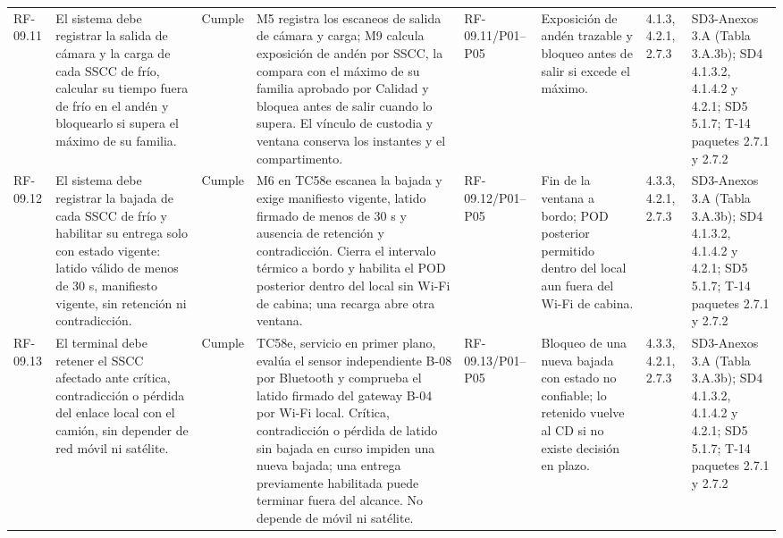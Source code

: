 \documentclass[oficio,firma,final]{lafrox}
\begin{document}
\begin{landscape}
{\begin{longtable}{@{}F{0.054} F{0.173} F{0.061} F{0.191} F{0.106} F{0.180} F{0.067} F{0.168}@{}}
  RF-09.11 & El sistema debe registrar la salida de cámara y la carga de cada SSCC de frío, calcular su tiempo fuera de frío en el andén y bloquearlo si supera el máximo de su familia. & Cumple & M5 registra los escaneos de salida de cámara y carga; M9 calcula exposición de andén por SSCC, la compara con el máximo de su familia aprobado por Calidad y bloquea antes de salir cuando lo supera. El vínculo de custodia y ventana conserva los instantes y el compartimento. & RF-09.11/\allowbreak{}P01--\allowbreak{}P05 & Exposición de andén trazable y bloqueo antes de salir si excede el máximo. & 4.1.3, 4.2.1, 2.7.3 & SD3-Anexos 3.A (Tabla 3.A.3b); SD4 4.1.3.2, 4.1.4.2 y 4.2.1; SD5 5.1.7; T-14 paquetes 2.7.1 y 2.7.2  \\
  RF-09.12 & El sistema debe registrar la bajada de cada SSCC de frío y habilitar su entrega solo con estado vigente: latido válido de menos de 30 s, manifiesto vigente, sin retención ni contradicción. & Cumple & M6 en TC58e escanea la bajada y exige manifiesto vigente, latido firmado de menos de 30 s y ausencia de retención y contradicción. Cierra el intervalo térmico a bordo y habilita el POD posterior dentro del local sin Wi-Fi de cabina; una recarga abre otra ventana. & RF-09.12/\allowbreak{}P01--\allowbreak{}P05 & Fin de la ventana a bordo; POD posterior permitido dentro del local aun fuera del Wi-Fi de cabina. & 4.3.3, 4.2.1, 2.7.3 & SD3-Anexos 3.A (Tabla 3.A.3b); SD4 4.1.3.2, 4.1.4.2 y 4.2.1; SD5 5.1.7; T-14 paquetes 2.7.1 y 2.7.2  \\
  RF-09.13 & El terminal debe retener el SSCC afectado ante crítica, contradicción o pérdida del enlace local con el camión, sin depender de red móvil ni satélite. & Cumple & TC58e, servicio en primer plano, evalúa el sensor independiente B-08 por Bluetooth y comprueba el latido firmado del gateway B-04 por Wi-Fi local. Crítica, contradicción o pérdida de latido sin bajada en curso impiden una nueva bajada; una entrega previamente habilitada puede terminar fuera del alcance. No depende de móvil ni satélite. & RF-09.13/\allowbreak{}P01--\allowbreak{}P05 & Bloqueo de una nueva bajada con estado no confiable; lo retenido vuelve al CD si no existe decisión en plazo. & 4.3.3, 4.2.1, 2.7.3 & SD3-Anexos 3.A (Tabla 3.A.3b); SD4 4.1.3.2, 4.1.4.2 y 4.2.1; SD5 5.1.7; T-14 paquetes 2.7.1 y 2.7.2  \\

\end{longtable}}
\end{landscape}
\end{document}
